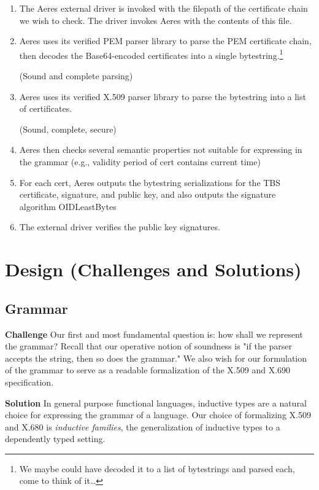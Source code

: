 \documentclass[11pt]{article}
\begin{document}
\begin{enumerate}
\item The Aeres external driver is invoked with the filepath of the certificate
chain we wish to check.
The driver invokes Aeres with the contents of this file.

\item Aeres uses its verified PEM parser library to parse the PEM certificate
chain, then decodes the Base64-encoded certificates into a single
bytestring.\footnote{We maybe could have decoded it to a list of bytestrings and
parsed each, come to think of it\ldots{}}

(Sound and complete parsing)

\item Aeres uses its verified X.509 parser library to parse the bytestring into a
list of certificates.

(Sound, complete, secure)

\item Aeres then checks several semantic properties not suitable for expressing
in the grammar (e.g., validity period of cert contains current time)

\item For each cert, Aeres outputs the bytestring serializations for the TBS
certificate, signature, and public key, and also outputs the signature
algorithm OIDLeastBytes

\item The external driver verifies the public key signatures.
\end{enumerate}



\section{Design (Challenges and Solutions)}
\label{sec:org4bf85da}
\subsection{Grammar}
\label{sec:org29db303}
\textbf{Challenge} Our first and most fundamental question is: how shall we represent
the grammar?
Recall that our operative notion of soundness is "if the parser accepts the
string, then so does the grammar."
We also wish for our formulation of the grammar to serve as a readable
formalization of the X.509 and X.690 specification.

\textbf{Solution} In general purpose functional languages, inductive types are a
natural choice for expressing the grammar of a language.
Our choice of formalizing X.509 and X.680 is \emph{inductive families}, the
generalization of inductive types to a dependently typed setting.
\end{document}
